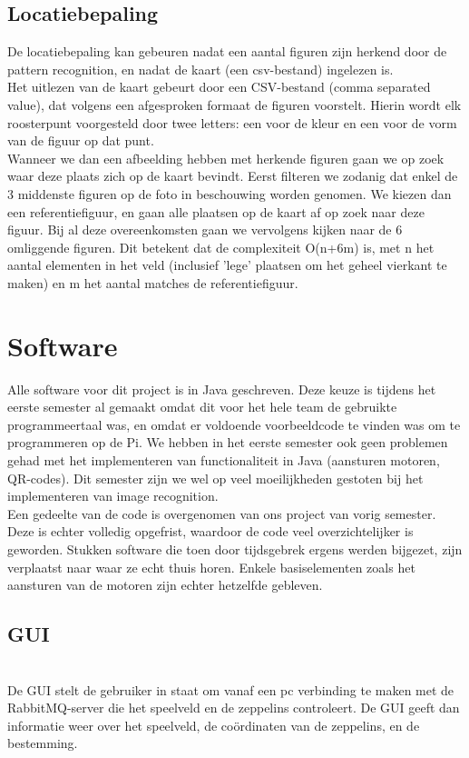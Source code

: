 \documentclass[tt]{penoverslag}
\begin{document}
\subsection{Locatiebepaling}
De locatiebepaling kan gebeuren nadat een aantal figuren zijn herkend door de pattern recognition, en nadat de kaart (een csv-bestand) ingelezen is. \\
Het uitlezen van de kaart gebeurt door een CSV-bestand (comma separated value), dat volgens een afgesproken formaat de figuren voorstelt. Hierin wordt elk roosterpunt voorgesteld door twee letters: een voor de kleur en een voor de vorm van de figuur op dat punt. \\
Wanneer we dan een afbeelding hebben met herkende figuren gaan we op zoek waar deze plaats zich op de kaart bevindt. Eerst filteren we zodanig dat enkel de 3 middenste figuren op de foto in beschouwing worden genomen. We kiezen dan een referentiefiguur, en gaan alle plaatsen op de kaart af op zoek naar deze figuur. Bij al deze overeenkomsten gaan we vervolgens kijken naar de 6 omliggende figuren. Dit betekent dat de complexiteit O(n+6m) is, met n het aantal elementen in het veld (inclusief 'lege' plaatsen om het geheel vierkant te maken) en m het aantal matches de referentiefiguur.

\section{Software}

Alle software voor dit project is in Java geschreven. Deze keuze is tijdens het eerste semester al gemaakt omdat dit voor het hele team de gebruikte programmeertaal was, en omdat er voldoende voorbeeldcode te vinden was om te programmeren op de Pi. We hebben in het eerste semester ook geen problemen gehad met het implementeren van functionaliteit in Java (aansturen motoren, QR-codes). Dit semester zijn we wel op veel moeilijkheden gestoten bij het implementeren van image recognition. \\

Een gedeelte van de code is overgenomen van ons project van vorig semester. Deze is echter volledig opgefrist, waardoor de code veel overzichtelijker is geworden. Stukken software die toen door tijdsgebrek ergens werden bijgezet, zijn verplaatst naar waar ze echt thuis horen. Enkele basiselementen zoals het aansturen van de motoren zijn echter hetzelfde gebleven.\\

\subsection{GUI} \\
De GUI stelt de gebruiker in staat om vanaf een pc verbinding te maken met de RabbitMQ-server die het speelveld en de zeppelins controleert. De GUI geeft dan informatie weer over het speelveld, de co\"{o}rdinaten van de zeppelins, en de bestemming. \\
\end{document}
